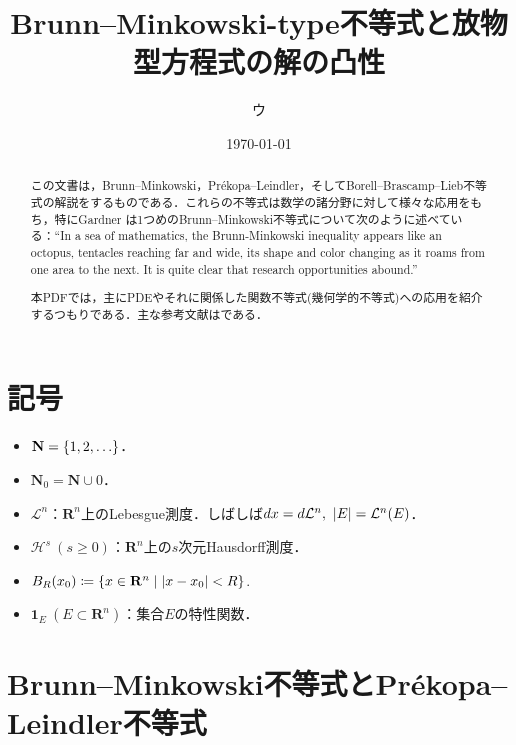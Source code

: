 \documentclass[a4j]{ltjsarticle}
\newcommand{\Rset}{\mathbf{R}}
\newcommand{\Nset}{\mathbf{N}}
\newcommand{\Lm}{\mathcal{L}}
\newcommand{\Hm}{\mathcal{H}}
\newcommand{\1}{\bm{1}}
\numberwithin{equation}{section}
\theoremstyle{definition}
\begin{document}
\title{Brunn--Minkowski-type不等式と放物型方程式の解の凸性}
\author{ウ}
\date{\today}
\maketitle
\begin{abstract}
    この文書は，Brunn--Minkowski，Pr\'ekopa--Leindler，そしてBorell--Brascamp--Lieb不等式の解説をするものである．これらの不等式は数学の諸分野に対して様々な応用をもち，特にGardner \cite{G}は1つめのBrunn--Minkowski不等式について次のように述べている：``In a sea of mathematics, the Brunn-Minkowski inequality appears like an octopus, tentacles reaching far and wide, its shape and color changing as it roams from one area to the next. It is quite clear that research opportunities abound.'' 

    本PDFでは，主にPDEやそれに関係した関数不等式(幾何学的不等式)への応用を紹介するつもりである．主な参考文献は\cites{BL,G,ILS}である．
\end{abstract}
\tableofcontents
\section*{記号}
\begin{itemize}
    \item $\Nset=\qty{1,2,\ldots}$．
    \item $\Nset_0=\Nset\cup\qty{0}$．
    \item $\Lm^n$：$\Rset^n$上のLebesgue測度．しばしば$dx=d\Lm^n,\ \abs{E}=\Lm^n(E)$．
    \item $\Hm^s\ (s\geq0)$：$\Rset^n$上の$s$次元Hausdorff測度．
    \item $B_R(x_0)\coloneqq \qty{x\in \Rset^n \mid \abs{x-x_0}<R}$.
    \item $\1_E\ (E\subset \Rset^n)$：集合$E$の特性関数．
\end{itemize}
\section{Brunn--Minkowski不等式とPr\'ekopa--Leindler不等式}
\end{document}

